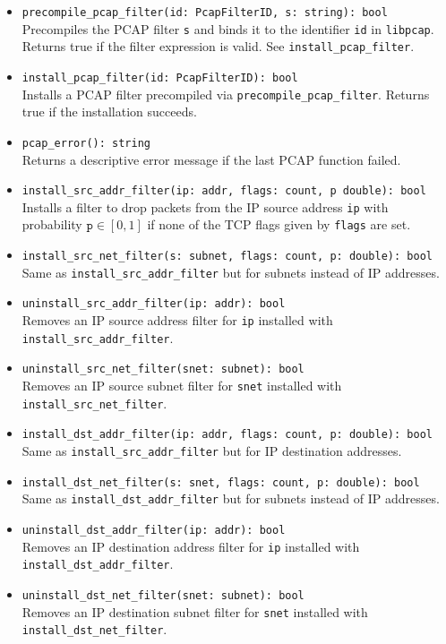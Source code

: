 \documentclass[10pt,landscape]{article}
\begin{document}
\begin{multicols*}{2}
\begin{itemize}
  \item \verb|precompile_pcap_filter(id: PcapFilterID, s: string): bool|\\
    Precompiles the PCAP filter \verb|s| and binds it to the identifier
    \verb|id| in \texttt{libpcap}. Returns true if the filter expression is
    valid. See \verb|install_pcap_filter|.
  \item \verb|install_pcap_filter(id: PcapFilterID): bool|\\
    Installs a PCAP filter precompiled via \verb|precompile_pcap_filter|.
    Returns true if the installation succeeds.
  \item \verb|pcap_error(): string|\\
    Returns a descriptive error message if the last PCAP function failed.
  \item \verb|install_src_addr_filter(ip: addr, flags: count, p double): bool|\\
    Installs a filter to drop packets from the IP source address \verb|ip| with
    probability $\mathtt{p} \in [0,1]$ if none of the TCP flags given by
    \verb|flags| are set.
  \item \verb|install_src_net_filter(s: subnet, flags: count, p: double): bool|\\
    Same as \verb|install_src_addr_filter| but for subnets instead of IP
    addresses.
  \item \verb|uninstall_src_addr_filter(ip: addr): bool|\\
    Removes an IP source address filter for \verb|ip| installed with
    \verb|install_src_addr_filter|.
  \item \verb|uninstall_src_net_filter(snet: subnet): bool|\\
    Removes an IP source subnet filter for \verb|snet| installed with
    \verb|install_src_net_filter|.
  \item \verb|install_dst_addr_filter(ip: addr, flags: count, p: double): bool|\\
    Same as \verb|install_src_addr_filter| but for IP destination addresses.
  \item \verb|install_dst_net_filter(s: snet, flags: count, p: double): bool|\\
    Same as \verb|install_dst_addr_filter| but for subnets instead of IP
    addresses.
  \item \verb|uninstall_dst_addr_filter(ip: addr): bool|\\
    Removes an IP destination address filter for \verb|ip| installed with
    \verb|install_dst_addr_filter|.
  \item \verb|uninstall_dst_net_filter(snet: subnet): bool|\\
    Removes an IP destination subnet filter for \verb|snet| installed with
    \verb|install_dst_net_filter|.
\end{itemize}


\end{multicols*}
\end{document}
